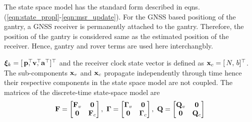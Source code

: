 The state space model has the standard form described in eqns. (\ref{eqn:state_propl}-\ref{eqn:msr_update}). 
For the GNSS based positiong of the gantry, a GNSS receiver is permanently attached to the gantry. Therefore, the position of the gantry is considered same as the estimated position of the receiver. Hence, gantry and rover terms are used here interchangbly.

$\Boldxi_k = [\,\Boldp^\top \!\!\!\!,  \, \Boldv^\top \!\!\!\!, \, \Bolda^\top]^\top$ 
and the receiver clock state vector is defined as $\mathbf{x}_c = [\,N, \, b]^\top$.
The sub-components $\mathbf{x}_v$ and $\mathbf{x}_c$ propagate independently through time hence their respective components in the state space model are not coupled.
The matrices of the discrete-time state-space model are
\begin{align}
	\mathbf{F} = \begin{bmatrix} \mathbf{F}_v & \boldsymbol{0} \\ \boldsymbol{0} & \mathbf{F}_c \end{bmatrix}, ~
	\boldsymbol{\Gamma} = \begin{bmatrix} \boldsymbol{\Gamma}_v & \boldsymbol{0} \\ \boldsymbol{0} & \boldsymbol{\Gamma}_c	\end{bmatrix}, ~
	\mathbf{Q} = \begin{bmatrix} \mathbf{Q}_v & \boldsymbol{0} \\ \boldsymbol{0} & \mathbf{Q}_c \end{bmatrix}
\end{align}

